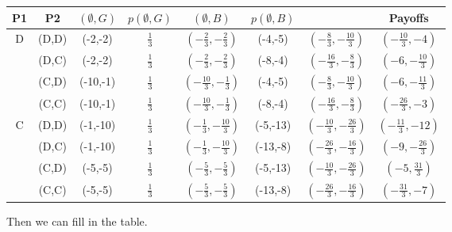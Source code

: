 \documentclass[12pt, oneside]{article}
\begin{document}
\begin{table}[h]
    \centering
    \renewcommand{\arraystretch}{1.5}
    \setlength{\tabcolsep}{8pt}
    \begin{tabular}{c|c|c|c|c|c|c|c}
        \toprule
        \textbf{P1} & \textbf{P2} & \( (\emptyset, G) \) & \( p(\emptyset, G) \) & \( (\emptyset, B) \) & \( p(\emptyset, B) \) &  & \textbf{Payoffs} \\
        \midrule
        \multirow{4}{*}{D} & (D,D) & (-2,-2) & \( \frac{1}{3} \) & \( \left(-\frac{2}{3}, -\frac{2}{3} \right) \) & (-4,-5) & \( \left(-\frac{8}{3}, -\frac{10}{3} \right) \) & \( \left(-\frac{10}{3}, -4 \right) \) \\
        & (D,C) & (-2,-2) & \( \frac{1}{3} \) & \( \left(-\frac{2}{3}, -\frac{2}{3} \right) \) & (-8,-4) & \( \left(-\frac{16}{3}, -\frac{8}{3} \right) \) & \( (-6,-\frac{10}{3}) \) \\
        & (C,D) & (-10,-1) & \( \frac{1}{3} \) & \( \left(-\frac{10}{3}, -\frac{1}{3} \right) \) & (-4,-5) & \( \left(-\frac{8}{3}, -\frac{10}{3} \right) \) & \( (-6,-\frac{11}{3}) \) \\
        & (C,C) & (-10,-1) & \( \frac{1}{3} \) & \( \left(-\frac{10}{3}, -\frac{1}{3} \right) \) & (-8,-4) & \( \left(-\frac{16}{3}, -\frac{8}{3} \right) \) & \( \left(-\frac{26}{3}, -3 \right) \) \\
        \midrule
        \multirow{4}{*}{C} & (D,D) & (-1,-10) & \( \frac{1}{3} \) & \( \left(-\frac{1}{3}, -\frac{10}{3} \right) \) & (-5,-13) & \( \left(-\frac{10}{3}, -\frac{26}{3} \right) \) & \( \left(-\frac{11}{3}, -12 \right) \) \\
        & (D,C) & (-1,-10) & \( \frac{1}{3} \) & \( \left(-\frac{1}{3}, -\frac{10}{3} \right) \) & (-13,-8) & \( \left(-\frac{26}{3}, -\frac{16}{3} \right) \) & \( (-9,-\frac{26}{3}) \) \\
        & (C,D) & (-5,-5) & \( \frac{1}{3} \) & \( \left(-\frac{5}{3}, -\frac{5}{3} \right) \) & (-5,-13) & \( \left(-\frac{10}{3}, -\frac{26}{3} \right) \) & \( (-5,\frac{31}{3}) \) \\
        & (C,C) & (-5,-5) & \( \frac{1}{3} \) & \( \left(-\frac{5}{3}, -\frac{5}{3} \right) \) & (-13,-8) & \( \left(-\frac{26}{3}, -\frac{16}{3} \right) \) & \( \left(-\frac{31}{3}, -7 \right) \) \\
        \bottomrule
    \end{tabular}
\end{table}

Then we can fill in the table.
\end{document}
